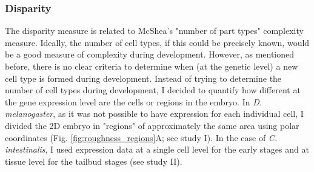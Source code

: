 \subsubsection{Disparity}

The disparity measure is related to  McShea's "number of part types" complexity measure. Ideally, the number of cell types, if this could be precisely known, would be a good measure of complexity during development. However, as mentioned before, there is no clear criteria to determine when (at the genetic level) a new cell type is formed during development.
%
%
Instead of trying to determine the number of cell types during development, I decided to quantify how different at the gene expression level are the cells or regions in the embryo. In \textit{D. melanogaster}, as it was not possible to have expression for each individual cell, I divided the 2D embryo in "regions" of approximately the same area using polar coordinates (Fig. \ref{fig:roughness_regions}A; see study I). 
In the case of \textit{C. intestinalis}, I used expression data at a single cell level for the early stages and at tissue level for the tailbud stages (see study II).

